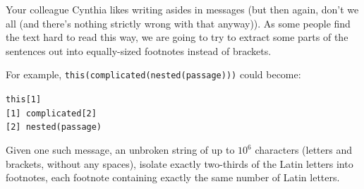 

Your colleague Cynthia likes writing asides in messages (but then again,
    don't we all (and there's nothing strictly wrong with that anyway)). As
some people find the text hard to read this way, we are going to try to
extract some parts of the sentences out into equally-sized footnotes instead
of brackets.

For example, \texttt{this(complicated(nested(passage)))} could become:

\indent \texttt{this[1]} \\
\indent \texttt{[1] complicated[2]} \\
\indent \texttt{[2] nested(passage)}

Given one such message, an unbroken string of up to $10^6$ characters
(letters and brackets, without any spaces), isolate exactly
two-thirds of the Latin letters into footnotes, each footnote containing
exactly the same number of Latin letters.

